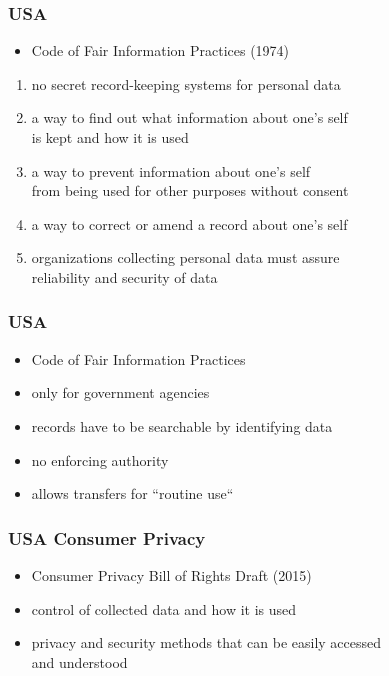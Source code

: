 \documentclass[dvipsnames]{beamer}
\theoremstyle{plain}
\begin{document}
\begin{frame}
  \frametitle{USA}

  \begin{itemize}
   \item Code of Fair Information Practices (1974)
  \end{itemize}

  \begin{enumerate}
    \item no secret record-keeping systems for personal data
    \item a way to find out what information about one's self\\
      is kept and how it is used
    \item a way to prevent information about one's self\\
      from being used for other purposes without consent
    \item a way to correct or amend a record about one's self
    \item organizations collecting personal data must assure\\
      reliability and security of data
  \end{enumerate}
\end{frame}

\begin{frame}
  \frametitle{USA}

  \begin{itemize}
    \item Code of Fair Information Practices
    \smallskip
    \item only for government agencies
    \item records have to be searchable by identifying data
    \item no enforcing authority
    \item allows transfers for ``routine use``
  \end{itemize}
\end{frame}

\begin{frame}
  \frametitle{USA Consumer Privacy}

  \begin{itemize}
    \item Consumer Privacy Bill of Rights Draft (2015)
    \smallskip
    \item control of collected data and how it is used
    \item privacy and security methods that can be easily accessed\\
      and understood
  \end{itemize}
\end{frame}
\end{document}
